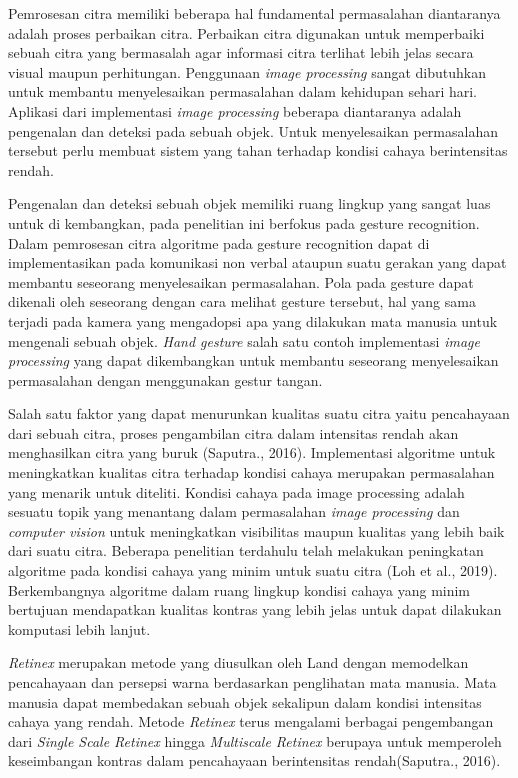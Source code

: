 Pemrosesan citra memiliki beberapa hal fundamental permasalahan diantaranya adalah proses perbaikan citra. Perbaikan citra digunakan untuk memperbaiki sebuah citra yang bermasalah agar informasi citra terlihat lebih jelas secara visual maupun perhitungan. Penggunaan \emph{image processing} sangat dibutuhkan untuk membantu menyelesaikan permasalahan dalam kehidupan sehari hari. Aplikasi dari implementasi \emph{image processing} beberapa diantaranya adalah pengenalan dan deteksi pada sebuah objek. Untuk menyelesaikan permasalahan tersebut perlu membuat sistem yang tahan terhadap kondisi cahaya berintensitas rendah.

Pengenalan dan deteksi sebuah objek memiliki ruang lingkup yang sangat luas untuk di kembangkan, pada penelitian ini berfokus pada gesture recognition.
Dalam pemrosesan citra algoritme pada gesture recognition dapat di implementasikan pada komunikasi non verbal ataupun suatu gerakan yang dapat membantu seseorang menyelesaikan permasalahan. Pola pada gesture dapat dikenali oleh seseorang dengan cara melihat gesture tersebut, hal yang sama terjadi pada kamera yang mengadopsi apa yang dilakukan mata manusia untuk mengenali sebuah objek. 
\emph{Hand gesture} salah satu contoh implementasi \emph{image processing} yang dapat dikembangkan untuk membantu seseorang menyelesaikan permasalahan dengan menggunakan gestur tangan. 

Salah satu faktor yang dapat menurunkan kualitas suatu citra yaitu pencahayaan dari sebuah citra, proses pengambilan citra dalam intensitas rendah akan menghasilkan citra yang buruk (Saputra., 2016).
Implementasi algoritme untuk meningkatkan kualitas citra terhadap kondisi cahaya merupakan permasalahan yang menarik untuk diteliti.
Kondisi cahaya pada image processing adalah sesuatu topik yang menantang dalam permasalahan \emph{image processing} dan \emph{computer vision} untuk meningkatkan visibilitas maupun kualitas yang lebih baik dari suatu citra. 
Beberapa penelitian terdahulu telah melakukan peningkatan algoritme pada kondisi cahaya yang minim untuk suatu citra (Loh et al., 2019). 
Berkembangnya algoritme dalam ruang lingkup kondisi cahaya yang minim bertujuan mendapatkan kualitas kontras yang lebih jelas untuk dapat dilakukan komputasi lebih lanjut.

\emph{Retinex} merupakan metode yang diusulkan oleh Land dengan memodelkan pencahayaan dan persepsi warna berdasarkan penglihatan mata manusia. Mata manusia dapat membedakan sebuah objek sekalipun dalam kondisi intensitas cahaya yang rendah. Metode \emph{Retinex} terus mengalami berbagai pengembangan dari \emph{Single Scale Retinex} hingga \emph{Multiscale Retinex} berupaya untuk memperoleh keseimbangan kontras dalam pencahayaan berintensitas rendah(Saputra., 2016).

